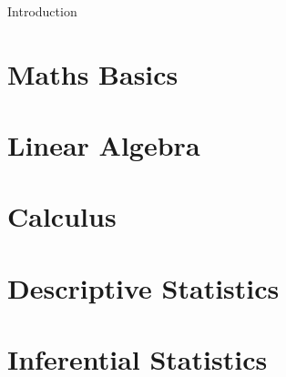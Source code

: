  \begin{frame}[fragile]\frametitle{}
 \begin{center}
 {\Large Introduction}
 \end{center}
 \end{frame}







\section[MathsIntro]{Maths Basics}


\section[LinAlg]{Linear Algebra}






 

\section[Calc]{Calculus}



\section[StatsDescr]{Descriptive Statistics}









\section[StatsInfer]{Inferential Statistics}







